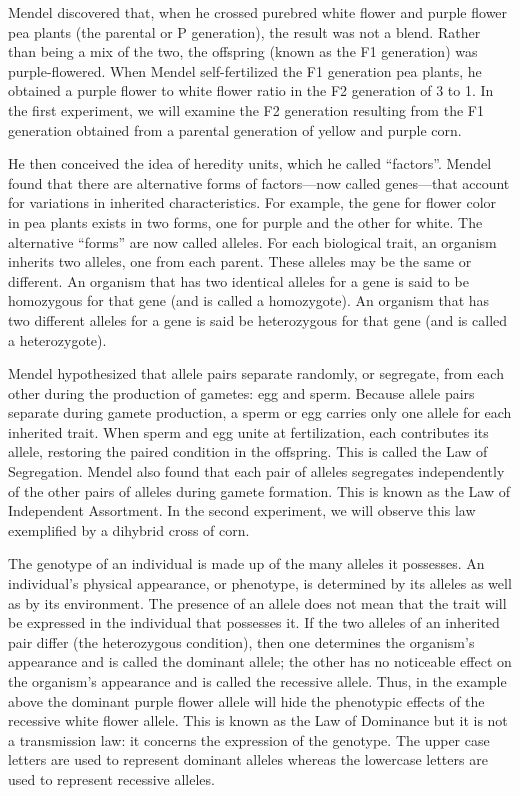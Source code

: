 \documentclass[]{book}
\theoremstyle{definition}
\theoremstyle{definition}
\theoremstyle{definition}
\theoremstyle{remark}
\begin{document}
Mendel discovered that, when he crossed purebred white flower and purple
flower pea plants (the parental or P generation), the result was not a
blend. Rather than being a mix of the two, the offspring (known as the
F1 generation) was purple-flowered. When Mendel self-fertilized the F1
generation pea plants, he obtained a purple flower to white flower ratio
in the F2 generation of 3 to 1. In the first experiment, we will examine
the F2 generation resulting from the F1 generation obtained from a
parental generation of yellow and purple corn.

He then conceived the idea of heredity units, which he called
``factors''. Mendel found that there are alternative forms of
factors---now called genes---that account for variations in inherited
characteristics. For example, the gene for flower color in pea plants
exists in two forms, one for purple and the other for white. The
alternative ``forms'' are now called alleles. For each biological trait,
an organism inherits two alleles, one from each parent. These alleles
may be the same or different. An organism that has two identical alleles
for a gene is said to be homozygous for that gene (and is called a
homozygote). An organism that has two different alleles for a gene is
said be heterozygous for that gene (and is called a heterozygote).

Mendel hypothesized that allele pairs separate randomly, or segregate,
from each other during the production of gametes: egg and sperm. Because
allele pairs separate during gamete production, a sperm or egg carries
only one allele for each inherited trait. When sperm and egg unite at
fertilization, each contributes its allele, restoring the paired
condition in the offspring. This is called the Law of Segregation.
Mendel also found that each pair of alleles segregates independently of
the other pairs of alleles during gamete formation. This is known as the
Law of Independent Assortment. In the second experiment, we will observe
this law exemplified by a dihybrid cross of corn.

The genotype of an individual is made up of the many alleles it
possesses. An individual's physical appearance, or phenotype, is
determined by its alleles as well as by its environment. The presence of
an allele does not mean that the trait will be expressed in the
individual that possesses it. If the two alleles of an inherited pair
differ (the heterozygous condition), then one determines the organism's
appearance and is called the dominant allele; the other has no
noticeable effect on the organism's appearance and is called the
recessive allele. Thus, in the example above the dominant purple flower
allele will hide the phenotypic effects of the recessive white flower
allele. This is known as the Law of Dominance but it is not a
transmission law: it concerns the expression of the genotype. The upper
case letters are used to represent dominant alleles whereas the
lowercase letters are used to represent recessive alleles.
\end{document}
